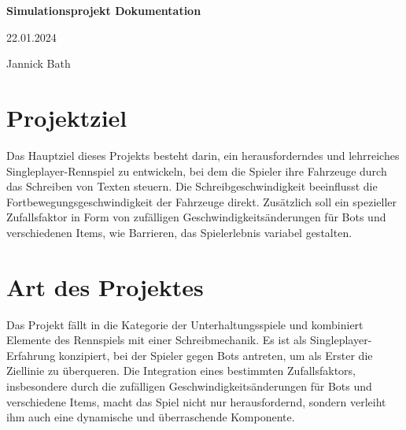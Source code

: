 \documentclass[hidelinks,12pt]{article}
\begin{document}
\begin{titlepage}
    \centering
    \vspace*{4cm} %

    \huge\bfseries Simulationsprojekt Dokumentation\par
    \vspace{1.5cm} %

    \Large 22.01.2024\par
    \vspace{1.5cm} %

    \large Jannick Bath\par
    \vspace{4cm} %

    \vfill

\end{titlepage}

\newpage

\tableofcontents %

\newpage

\section{Projektziel}
Das Hauptziel dieses Projekts besteht darin, ein herausforderndes und lehrreiches Singleplayer-Rennspiel zu entwickeln, bei dem die Spieler ihre Fahrzeuge durch das Schreiben von Texten steuern. Die Schreibgeschwindigkeit beeinflusst die Fortbewegungsgeschwindigkeit der Fahrzeuge direkt. Zusätzlich soll ein spezieller Zufallsfaktor in Form von zufälligen Geschwindigkeitsänderungen für Bots und verschiedenen Items, wie Barrieren, das Spielerlebnis variabel gestalten.

\section{Art des Projektes}
Das Projekt fällt in die Kategorie der Unterhaltungsspiele und kombiniert Elemente des Rennspiels mit einer Schreibmechanik. Es ist als Singleplayer-Erfahrung konzipiert, bei der Spieler gegen Bots antreten, um als Erster die Ziellinie zu überqueren. Die Integration eines bestimmten Zufallsfaktors, insbesondere durch die zufälligen Geschwindigkeitsänderungen für Bots und verschiedene Items, macht das Spiel nicht nur herausfordernd, sondern verleiht ihm auch eine dynamische und überraschende Komponente.
\end{document}
